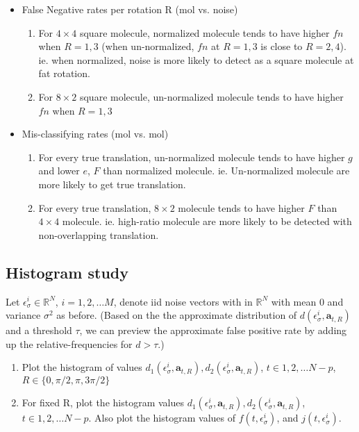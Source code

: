 \documentclass[11pt]{article}
\newcommand{\ba}{\boldsymbol{a}}
\begin{document}
\begin{itemize}
\begin{enumerate}
\begin{itemize}
            \item False Negative rates per rotation R (mol vs. noise)
            \begin{enumerate}
                \item For $4\times 4$ square molecule, normalized molecule tends to have higher $fn$ when $R=1,3$ (when un-normalized, $fn$ at $R=1,3$ is close to $R=2,4$). ie. when normalized, noise is more likely to detect as a square molecule at fat rotation.
                \item For $8\times 2$ square molecule, un-normalized molecule tends to have higher $fn$ when $R=1,3$
            \end{enumerate}
        
            \item Mis-classifying rates (mol vs. mol)
            \begin{enumerate}
                \item For every true translation, un-normalized molecule tends to have higher $g$ and lower $e$, $F$ than normalized molecule. ie. Un-normalized molecule are more likely to get true translation.
                \item For every true translation, $8\times 2$ molecule tends to have higher $F$ than $4\times 4$ molecule. ie. high-ratio molecule are more likely to be detected with non-overlapping translation.
            \end{enumerate}
        \end{itemize}
        
    \end{enumerate}
    
    \end{itemize}

\subsection{Histogram study}
Let $\epsilon_{\sigma}^{i}  \in \mathbb{R}^{N}$, $i=1,2,\ldots M$, denote iid noise vectors with in $\mathbb{R}^{N}$ with mean $0$ and variance $\sigma^2$ as before. (Based on the the approximate distribution of $d(\epsilon_{\sigma}^i, \ba_{t,R})$ and a threshold $\tau$, we can preview the approximate false positive rate by adding up the relative-frequencies for $d>\tau$.)

\begin{enumerate}
\item Plot the histogram of values $d_{1}(\epsilon_{\sigma}^i, \ba_{t,R}), d_{2}(\epsilon_{\sigma}^i, \ba_{t,R})$, $t\in 1,2,\ldots N-p$, $R \in \{ 0,\pi/2, \pi, 3\pi/2 \}$ 
\item For fixed R, plot the histogram values $d_{1}(\epsilon_{\sigma}^i, \ba_{t,R}), d_{2}(\epsilon_{\sigma}^i, \ba_{t,R})$, $t\in 1,2,\ldots N-p$. Also plot the histogram values of $f(t,\epsilon_{\sigma}^i)$, and $j(t,\epsilon_{\sigma}^i)$.
\end{enumerate}
\end{document}
